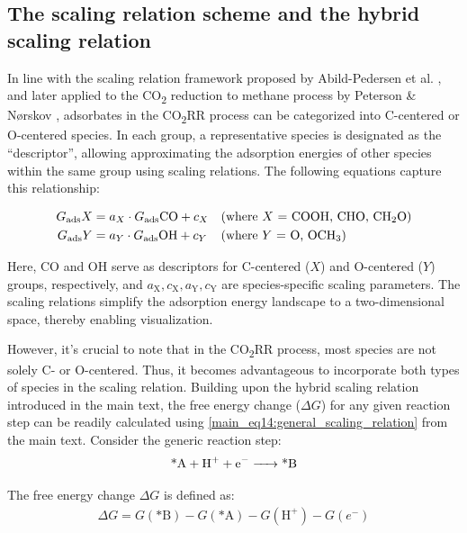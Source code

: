 \documentclass[a4paper, 12pt]{article}
\begin{document}
\subsection{The scaling relation scheme and the hybrid scaling relation}
\label{supp_sec2.5_scaling}

In line with the scaling relation framework proposed by Abild-Pedersen et al. \cite{abild2007scaling},
and later applied to the CO\textsubscript{2} reduction to methane process by Peterson \& Nørskov \cite{peterson2012activity},
adsorbates in the CO\textsubscript{2}RR process can be categorized into C-centered or O-centered species.
In each group, a representative species is designated as the ``descriptor'', allowing approximating the adsorption energies of other species within the same group using scaling relations.
The following equations capture this relationship:

\begin{align}
  G_{\text{ads}}X &= a_X \cdot G_{\text{ads}}{\text{CO}} + c_X
  && \text{(where  $X$ = COOH, CHO, CH\textsubscript{2}O)}  \label{supp_eq1:scaling_relation_x_co}  \\
  G_{\text{ads}}Y &= a_Y \cdot G_{\text{ads}}{\text{OH}} + c_Y
  && \text{(where  $Y$ = O, OCH\textsubscript{3})}          \label{supp_eq2:scaling_relation_y_oh}
\end{align}

Here, CO and OH serve as descriptors for C-centered ($X$) and O-centered ($Y$) groups, respectively, and $a_{\mathrm{X}}, c_{\mathrm{X}}, a_{\mathrm{Y}}, c_{\mathrm{Y}}$ are species-specific scaling parameters.
The scaling relations simplify the adsorption energy landscape to a two-dimensional space, thereby enabling visualization.

However, it's crucial to note that in the CO\textsubscript{2}RR process, most species are not solely C- or O-centered.
Thus, it becomes advantageous to incorporate both types of species in the scaling relation.
Building upon the hybrid scaling relation introduced in the main text, the free energy change ($\Delta\mathit{G}$) for any given reaction step can be readily calculated using \cref{main_eq14:general_scaling_relation} from the main text.
Consider the generic reaction step:
\begin{align}
  \ce{\text{*}A + H+ + e- -> \text{*}B}  \label{supp_eq3:generic_reaction}
\end{align}

The free energy change $\Delta\mathit{G}$ is defined as:
\begin{align}
  \Delta G = G(\text{*}\mathrm{B}) - G(\text{*}\mathrm{A}) - G(\mathrm{H}^+) - G(e^-)  \label{supp_eq4:free_energy_change}
\end{align}
\end{document}

